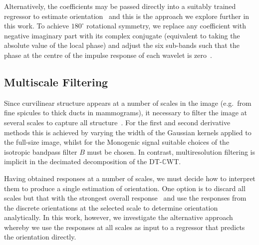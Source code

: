 \documentclass[runningheads,a4paper]{llncs}
\def\dtcwt{DT-$\mathbb{C}$WT}
\def\eg{e.g.}
\newcommand{\comment}[1]{}
\begin{document}
Alternatively, the coefficients may be passed directly into a suitably trained regressor to estimate orientation~\cite{Berks_etal_IPMI11} and this is the approach we explore further in this work. To achieve $180^\circ$ rotational symmetry, we replace any coefficient with negative imaginary part with its complex conjugate (equivalent to taking the absolute value of the local phase) and adjust the six sub-bands such that the phase at the centre of the impulse response of each wavelet is zero~\cite{Kingsbury_ECSP06,Berks_etal_IPMI11}.

\comment{When dealing with a complex response, $c$, we separate its magnitude, $|c|$, from its phase, $\angle c$. Since orientation is only defined up to a rotation of $180^\circ$, however, a point with phase $\phi$ displaced by $d$ from the centre of a line is indistinguishable from a point with phase $-\phi$ displaced by $-d$ from the same line when looking in the opposite direction; we therefore take the absolute value of phase, $|\angle c|$, at each pixel.}


\subsection{Multiscale Filtering}
Since curvilinear structure appears at a number of scales in the image (\eg~from fine spicules to thick ducts in mammograms), it necessary to filter the image at several scales to capture all structure~\cite{Lindeberg_IJCV98b}. For the first and second derivative methods this is achieved  by varying the width of the Gaussian kernels applied to the full-size image, whilst for the Monogenic signal suitable choices of the isotropic bandpass filter $B$ must be chosen. In contrast, multiresolution filtering is implicit in the decimated decomposition of the \dtcwt.

Having obtained responses at a number of scales, we must decide how to interpret them to produce a single estimation of orientation. One option is to discard all scales but that with the strongest overall response~\cite{Karssemeijer_teBrake_TMI96} and use the responses from the discrete orientations at the selected scale to determine orientation analytically. In this work, however, we investigate the alternative approach whereby we use the responses at all scales as input to a regressor that predicts the orientation directly. \comment{This general purpose approach has the added advantage that it can be applied for filter banks where an analytic solution is not obvious (such as the \dtcwt).}
\end{document}
